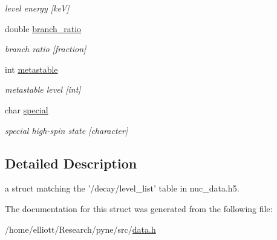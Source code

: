 \begin{DoxyCompactItemize}
\begin{DoxyCompactList}\small\item\em level energy \mbox{[}ke\-V\mbox{]} \end{DoxyCompactList}\item 
\hypertarget{structpyne_1_1level__data_a5ce97c540e0ce558156e5a43510a4633}{double \hyperlink{structpyne_1_1level__data_a5ce97c540e0ce558156e5a43510a4633}{branch\-\_\-ratio}}\label{structpyne_1_1level__data_a5ce97c540e0ce558156e5a43510a4633}

\begin{DoxyCompactList}\small\item\em branch ratio \mbox{[}fraction\mbox{]} \end{DoxyCompactList}\item 
\hypertarget{structpyne_1_1level__data_a7a71068eed39597f007cc6624727e954}{int \hyperlink{structpyne_1_1level__data_a7a71068eed39597f007cc6624727e954}{metastable}}\label{structpyne_1_1level__data_a7a71068eed39597f007cc6624727e954}

\begin{DoxyCompactList}\small\item\em metastable level \mbox{[}int\mbox{]} \end{DoxyCompactList}\item 
\hypertarget{structpyne_1_1level__data_acabc31aa71741dbc2ea5485ca51da0d6}{char \hyperlink{structpyne_1_1level__data_acabc31aa71741dbc2ea5485ca51da0d6}{special}}\label{structpyne_1_1level__data_acabc31aa71741dbc2ea5485ca51da0d6}

\begin{DoxyCompactList}\small\item\em special high-\/spin state \mbox{[}character\mbox{]} \end{DoxyCompactList}\end{DoxyCompactItemize}


\subsection{Detailed Description}
a struct matching the '/decay/level\-\_\-list' table in nuc\-\_\-data.\-h5. 

The documentation for this struct was generated from the following file\-:\begin{DoxyCompactItemize}
\item 
/home/elliott/\-Research/pyne/src/\hyperlink{data_8h}{data.\-h}\end{DoxyCompactItemize}
